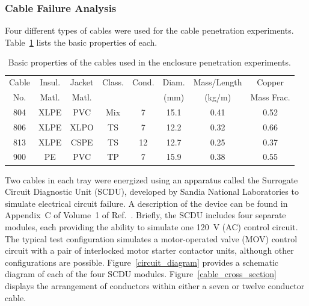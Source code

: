 \FloatBarrier

\subsubsection{Cable Failure Analysis}

Four different types of cables were used for the cable penetration experiments. Table~\ref{cables} lists the basic properties of each.

\begin{table}[ht]
\centering
\caption[Basic properties of cables]{Basic properties of the cables used in the enclosure penetration experiments.}
\label{cables}
\begin{tabular}{|c|c|c|c|c|c|c|c|}
\hline
Cable & Insul.  & Jacket  & Class.  & Cond.  & Diam.  & Mass/Length & Copper     \\
No.   & Matl.   & Matl.   &         &        & (mm)   & (kg/m)      & Mass Frac. \\ \hline
804   & XLPE    & PVC     & Mix     & 7      & 15.1   & 0.41        & 0.52       \\ \hline
806   & XLPE    & XLPO    & TS      & 7      & 12.2   & 0.32        & 0.66       \\ \hline
813   & XLPE    & CSPE    & TS      & 12     & 12.7   & 0.25        & 0.37       \\ \hline
900   & PE      & PVC     & TP      & 7      & 15.9   & 0.38        & 0.55       \\ \hline
\end{tabular}
\end{table}

Two cables in each tray were energized using an apparatus called the Surrogate Circuit Diagnostic Unit (SCDU), developed by Sandia National Laboratories to simulate electrical circuit failure. A description of the device can be found in Appendix~C of Volume~1 of Ref.~\cite{CAROLFIRE}. Briefly, the SCDU includes four separate modules, each providing the ability to simulate one 120~V (AC) control circuit. The typical test configuration simulates a motor-operated valve (MOV) control circuit with a pair of interlocked motor starter contactor units, although other configurations are possible. Figure~\ref{circuit_diagram} provides a  schematic diagram of each of the four SCDU modules. Figure~\ref{cable_cross_section} displays the arrangement of conductors within either a seven or twelve conductor cable.


